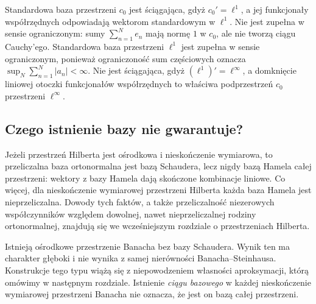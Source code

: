 \begin{przyklad}
\label{ex:james-examples27}
Standardowa baza przestrzeni $c_0$ jest ściągająca,
gdyż $c_0'=\ell^1$, a jej funkcjonały współrzędnych
odpowiadają wektorom standardowym w $\ell^1$.
Nie jest zupełna w sensie ograniczonym: sumy
$\sum_{n=1}^Ne_n$ mają normę $1$ w $c_0$, ale
nie tworzą ciągu Cauchy'ego.
Standardowa baza przestrzeni $\ell^1$ jest zupełna w sensie
ograniczonym, ponieważ ograniczoność sum częściowych oznacza
$\sup_N\sum_{n=1}^N|a_n|<\infty$.
Nie jest ściągająca, gdyż $(\ell^1)'=\ell^\infty$,
a domknięcie liniowej otoczki funkcjonałów współrzędnych
to właściwa podprzestrzeń $c_0$ przestrzeni $\ell^\infty$.
\end{przyklad}

\subsection{Czego istnienie bazy nie gwarantuje?}

\begin{uwaga}
\label{rem:hamel-vs-schauder27}
Jeżeli przestrzeń Hilberta jest ośrodkowa i nieskończenie
wymiarowa, to przeliczalna baza ortonormalna jest bazą
Schaudera, lecz nigdy bazą Hamela całej przestrzeni:
wektory z bazy Hamela dają skończone kombinacje liniowe.
Co więcej, dla nieskończenie wymiarowej przestrzeni Hilberta
każda baza Hamela jest nieprzeliczalna. Dowody tych faktów,
a także przeliczalność niezerowych współczynników
względem dowolnej, nawet nieprzeliczalnej rodziny
ortonormalnej, znajdują się we wcześniejszym rozdziale o przestrzeniach Hilberta.
\end{uwaga}

\begin{uwaga}
\label{rem:enflo27}
Istnieją ośrodkowe przestrzenie Banacha bez bazy Schaudera.
Wynik ten ma charakter głęboki i nie wynika z samej
nierówności Banacha--Steinhausa. Konstrukcje tego typu
wiążą się z niepowodzeniem własności aproksymacji,
którą omówimy w następnym rozdziale. Istnienie
\emph{ciągu bazowego} w każdej nieskończenie wymiarowej
przestrzeni Banacha nie oznacza, że jest on bazą całej
przestrzeni.
\end{uwaga}
